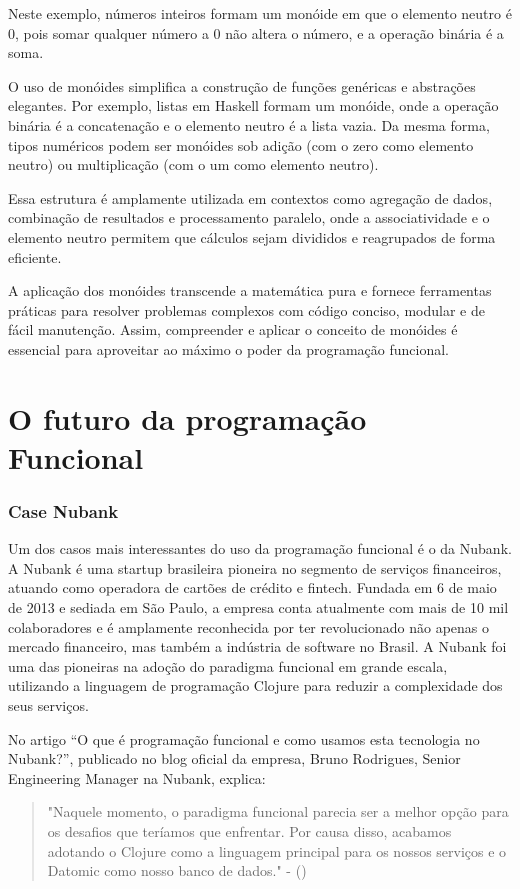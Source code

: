 Neste exemplo, números inteiros formam um monóide em que o elemento neutro é 0, pois somar qualquer número a 0 não altera o número, e a operação binária é a soma. 

O uso de monóides simplifica a construção de funções genéricas e abstrações elegantes. Por exemplo, listas em Haskell formam um monóide, onde a operação binária é a concatenação e o elemento neutro é a lista vazia. Da mesma forma, tipos numéricos podem ser monóides sob adição (com o zero como elemento neutro) ou multiplicação (com o um como elemento neutro).

Essa estrutura é amplamente utilizada em contextos como agregação de dados, combinação de resultados e processamento paralelo, onde a associatividade e o elemento neutro permitem que cálculos sejam divididos e reagrupados de forma eficiente.

A aplicação dos monóides transcende a matemática pura e fornece ferramentas práticas para resolver problemas complexos com código conciso, modular e de fácil manutenção. Assim, compreender e aplicar o conceito de monóides é essencial para aproveitar ao máximo o poder da programação funcional.


\chapter{O futuro da programação Funcional}

\subsection{Case Nubank}

Um dos casos mais interessantes do uso da programação funcional é o da Nubank. A Nubank é uma startup brasileira pioneira no segmento de serviços financeiros, atuando como operadora de cartões de crédito e fintech. Fundada em 6 de maio de 2013 e sediada em São Paulo, a empresa conta atualmente com mais de 10 mil colaboradores e é amplamente reconhecida por ter revolucionado não apenas o mercado financeiro, mas também a indústria de software no Brasil. A Nubank foi uma das pioneiras na adoção do paradigma funcional em grande escala, utilizando a linguagem de programação Clojure para reduzir a complexidade dos seus serviços.

No artigo “O que é programação funcional e como usamos esta tecnologia no Nubank?”, publicado no blog oficial da empresa, Bruno Rodrigues, Senior Engineering Manager na Nubank, explica: 

\begin{quote}
 "Naquele momento, o paradigma funcional parecia ser a melhor opção para os desafios que teríamos que enfrentar. Por causa disso, acabamos adotando o Clojure como a linguagem principal para os nossos serviços e o Datomic como nosso banco de dados." - ()
\end{quote}
 
